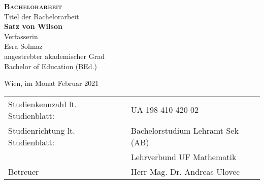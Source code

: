 %
%
\begin{center}
  {\Huge \textsc{\textbf{Bachelorarbeit}}}\\
  \vspace*{2.cm}
  {\Large Titel der Bachelorarbeit}\linebreak\\
  {\huge \textbf{Satz von Wilson}}\\
  \vspace*{3.cm}
  {\Large Verfasserin}\linebreak\\
  {\LARGE Esra Solmaz}\\
  \vspace*{3.cm}
  {\Large angestrebter akademischer Grad}\linebreak\\
  {\LARGE Bachelor of Education (BEd.)}
\end{center}
\vspace*{2.cm}

{\Large Wien, im Monat Februar 2021}
\vspace*{2.cm}

{\Large
  {\def\arraystretch{1}\tabcolsep=10pt %
    \begin{tabular}{@{}ll} %
      Studienkennzahl lt. Studienblatt: & UA 198 410 420 02 \\
      \rule{0pt}{3ex}%
      Studienrichtung lt. Studienblatt: & Bachelorstudium Lehramt Sek (AB) \\
                                        & Lehrverbund UF Mathematik \\
      \rule{0pt}{3ex}%
      Betreuer & Herr Mag. Dr. Andreas Ulovec
    \end{tabular}
  }
}
